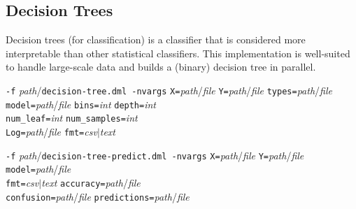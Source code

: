 \subsection{Decision Trees}
\label{decision_trees}

Decision trees (for classification) is a classifier that is considered
more interpretable than other statistical classifiers. This implementation
is well-suited to handle large-scale data and builds a (binary) decision 
tree in parallel.\\

\begin{tabbing}
\texttt{-f} \textit{path}/\texttt{decision-tree.dml -nvargs} 
\=\texttt{X=}\textit{path}/\textit{file} 
  \texttt{Y=}\textit{path}/\textit{file} 
  \texttt{types=}\textit{path}/\textit{file}\\
\>\texttt{model=}\textit{path}/\textit{file}
  \texttt{bins=}\textit{int}
  \texttt{depth=}\textit{int}\\
\>\texttt{num\_leaf=}\textit{int}
  \texttt{num\_samples=}\textit{int}\\
\>\texttt{Log=}\textit{path}/\textit{file}
  \texttt{fmt=}\textit{csv}$\vert$\textit{text}
\end{tabbing}

\begin{tabbing}
\texttt{-f} \textit{path}/\texttt{decision-tree-predict.dml -nvargs} 
\=\texttt{X=}\textit{path}/\textit{file} 
  \texttt{Y=}\textit{path}/\textit{file} 
  \texttt{model=}\textit{path}/\textit{file}\\
\>\texttt{fmt=}\textit{csv}$\vert$\textit{text}
  \texttt{accuracy=}\textit{path}/\textit{file}\\
\>\texttt{confusion=}\textit{path}/\textit{file}
  \texttt{predictions=}\textit{path}/\textit{file}
\end{tabbing}


